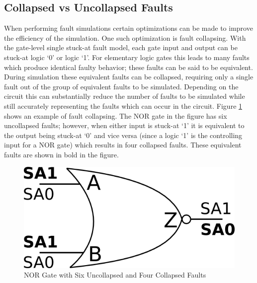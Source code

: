\documentclass[12pt]{report}
\begin{document}
\subsection{Collapsed vs Uncollapsed Faults}
When performing fault simulations certain optimizations can be made to improve the efficiency of the simulation.  One such optimization is fault collapsing.  With the gate-level single stuck-at fault model, each gate input and output can be stuck-at logic `0' or logic `1'.  For elementary logic gates this leads to many faults which produce identical faulty behavior; these faults can be said to be equivalent\cite{defectforcmos}.  During simulation these equivalent faults can be collapsed, requiring only a single fault out of the group of equivalent faults to be simulated\cite{defectforcmos}.  Depending on the circuit this can substantially reduce the number of faults to be simulated while still accurately representing the faults which can occur in the circuit\cite{defectforcmos}.  Figure \ref{fig:faultcollapse} shows an example of fault collapsing.  The NOR gate in the figure has six uncollapsed faults; however, when either input is stuck-at `1' it is equivalent to the output being stuck-at `0' and vice versa (since a logic `1' is the controlling input for a NOR gate) which results in four collapsed faults.  These equivalent faults are shown in bold in the figure.
\begin{figure}
	\begin{center}
		\includegraphics[scale=1]{images/nor-faultcollapse}
	\end{center}
  \caption{NOR Gate with Six Uncollapsed and Four Collapsed Faults}
  \label{fig:faultcollapse}
\end{figure}
\end{document}
